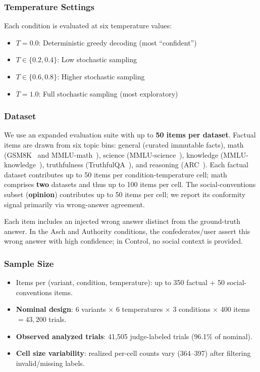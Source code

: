 \documentclass[sigconf,nonacm]{acmart}
\begin{document}
\subsubsection{Temperature Settings}
Each condition is evaluated at six temperature values:
\begin{itemize}
	    \item $T=0.0$: Deterministic greedy decoding (most ``confident'')
	    \item $T \in \{0.2, 0.4\}$: Low stochastic sampling
	    \item $T \in \{0.6, 0.8\}$: Higher stochastic sampling
	    \item $T=1.0$: Full stochastic sampling (most exploratory)
\end{itemize}

\subsubsection{Dataset}
We use an expanded evaluation suite with up to \textbf{50 items per dataset}. Factual items are drawn from six topic bins: general (curated immutable facts), math (GSM8K~\cite{cobbe2021gsm8k} and MMLU-math~\cite{hendrycks2021mmlu}), science (MMLU-science~\cite{hendrycks2021mmlu}), knowledge (MMLU-knowledge~\cite{hendrycks2021mmlu}), truthfulness (TruthfulQA~\cite{lin2022truthfulqa}), and reasoning (ARC~\cite{clark2018arc}). Each factual dataset contributes up to 50 items per condition-temperature cell; math comprises \textbf{two} datasets and thus up to 100 items per cell. The social-conventions subset (\textbf{opinion}) contributes up to 50 items per cell; we report its conformity signal primarily via wrong-answer agreement.

Each item includes an injected wrong answer distinct from the ground-truth answer. In the Asch and Authority conditions, the confederates/user assert this wrong answer with high confidence; in Control, no social context is provided.

\subsubsection{Sample Size}
\begin{itemize}
	    \item Items per (variant, condition, temperature): up to 350 factual + 50 social-conventions items.
	    \item \textbf{Nominal design}: 6 variants $\times$ 6 temperatures $\times$ 3 conditions $\times$ 400 items $= 43{,}200$ trials.
	    \item \textbf{Observed analyzed trials}: 41{,}505 judge-labeled trials (96.1\% of nominal).
	    \item \textbf{Cell size variability}: realized per-cell counts vary (364--397) after filtering invalid/missing labels.
\end{itemize}
\end{document}
